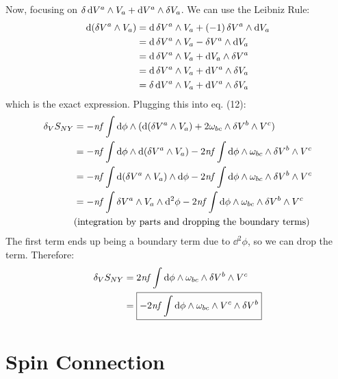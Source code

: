 \documentclass[12pt]{article}
\begin{document}
Now, focusing on $\var{\dd{V^a}} \wedge V_a + \dd V^a \wedge \var{V_a}$. We can use the Leibniz Rule:
\begin{align*}
  \dd(\var{V^a} \wedge V_a) &= \dd{\var{V^a}} \wedge V_a + (-1)\var{V^a} \wedge \dd{V_a} \\
  &= \dd{\var{V^a}} \wedge V_a - \var{V^a} \wedge \dd{V_a} \\
  &= \dd{\var{V^a}} \wedge V_a + \dd{V_a} \wedge \var{V^a} \\
  &= \dd{\var{V^a}} \wedge V_a + \dd{V^a} \wedge \var{V_a} \\
  &= \var{\dd{V^a}} \wedge V_a + \dd{V^a} \wedge \var{V_a}
\end{align*}
which is the exact expression. Plugging this into eq. (12):
\begin{align*}
  \var_V{S_{NY}} &= -\mathit{nf}\int \dd\phi \wedge (\dd(\var{V^a} \wedge V_a) + 2\omega_{bc} \wedge \var{V^b} \wedge V^c) \\
  &= -\mathit{nf} \int \dd\phi \wedge \dd(\var{V^a} \wedge V_a) - 2\mathit{nf} \int \dd\phi \wedge \omega_{bc} \wedge \var{V^b} \wedge V^c \\
  &= -\mathit{nf} \int \dd(\var{V^a} \wedge V_a) \wedge \dd\phi - 2\mathit{nf} \int \dd\phi \wedge \omega_{bc} \wedge \var{V^b} \wedge V^c \\
  &= -\mathit{nf} \int \var{V^a} \wedge V_a \wedge \dd^2\phi - 2\mathit{nf} \int \dd\phi \wedge \omega_{bc} \wedge \var{V^b} \wedge V^c \\
  &\text{(integration by parts and dropping the boundary terms)}
\end{align*}
The first term ends up being a boundary term due to $\dd^2{\phi}$, so we can drop the term. Therefore:
\begin{align}
  \var_V{S_{NY}} &= 2\mathit{nf} \int \dd\phi \wedge \omega_{bc} \wedge \var{V^b} \wedge V^c \nonumber \\
  &= \boxed{-2\mathit{nf} \int \dd\phi \wedge \omega_{bc} \wedge V^c \wedge \var{V^b}}
\end{align}

\section{Spin Connection}
\end{document}
